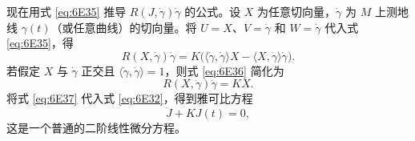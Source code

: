 现在用式 \eqref{eq:6E35} 推导 $R(J,\dot\gamma)\dot\gamma$ 的公式。设 $X$ 为任意切向量，$\dot\gamma$ 为 $M$ 上测地线 $\gamma(t)$（或任意曲线）的切向量。将 $U=X$、$V=\dot\gamma$ 和 $W=\dot\gamma$ 代入式 \eqref{eq:6E35}，得
\begin{equation*}
  R(X,\dot\gamma)\dot\gamma=K\bigl(\langle\dot\gamma,\dot\gamma\rangle X
      -\langle X,\dot\gamma\rangle\dot\gamma\bigr).
  \tag{6E36}\label{eq:6E36}
\end{equation*}
若假定 $X$ 与 $\dot\gamma$ 正交且 $\langle\dot\gamma,\dot\gamma\rangle=1$，则式 \eqref{eq:6E36} 简化为
\begin{equation*}
  R(X,\dot\gamma)\dot\gamma=KX.
  \tag{6E37}\label{eq:6E37}
\end{equation*}
将式 \eqref{eq:6E37} 代入式 \eqref{eq:6E32}，得到雅可比方程
\begin{equation*}
  \ddot J+KJ(t)=0,
  \tag{6E38}\label{eq:6E38}
\end{equation*}
这是一个普通的二阶线性微分方程。

